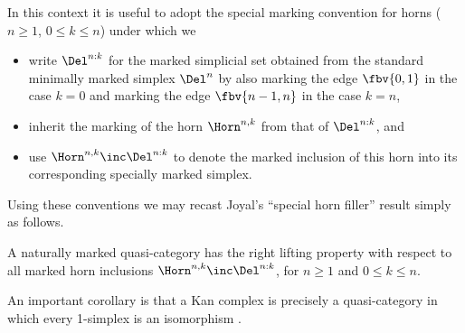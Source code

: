 \begin{ntn}
      In this context it is useful to adopt the special marking convention for horns ($n \geq 1$, $0\leq k \leq n$) under which we
      \begin{itemize}
      \item write $\Del^{n:k}$ for the marked simplicial set obtained from the standard minimally marked simplex $\Del^n$ by also marking the edge $\fbv{0,1}$ in the case $k=0$ and marking the edge $\fbv{n-1,n}$ in the case $k=n$,
      \item inherit the marking of the horn $\Horn^{n,k}$ from that of $\Del^{n:k}$, and
      \item use $\Horn^{n,k}\inc\Del^{n:k}$ to denote the marked inclusion of this horn into its corresponding specially marked simplex.
      \end{itemize}
\end{ntn}

      Using these conventions we may recast Joyal's ``special horn filler'' result \cite[1.3]{Joyal:2002:QuasiCategories} simply as follows.

\begin{prop}[Joyal]\label{prop:joyal-special-horn} A naturally marked quasi-category has the right lifting property with respect to all marked horn inclusions $\Horn^{n,k}\inc\Del^{n:k}$, for $n\geq 1$ and $0\leq k \leq n$.
\end{prop}

 An important corollary is that a Kan complex is precisely a quasi-category in which every 1-simplex is an isomorphism \cite[1.4]{Joyal:2002:QuasiCategories}.

